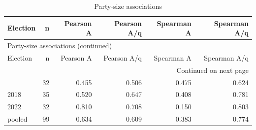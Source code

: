\begingroup
\scriptsize
\setlength{\tabcolsep}{3.2pt}
\begin{longtable}{lrrrrr}
\caption{Party-size associations}\label{tab:report-party-size-correlations} \\
\toprule
Election & n & Pearson A & Pearson A/q & Spearman A & Spearman A/q \\
\midrule
\endfirsthead
\multicolumn{6}{l}{\footnotesize Party-size associations (continued)} \\
\toprule
Election & n & Pearson A & Pearson A/q & Spearman A & Spearman A/q \\
\midrule
\endhead
\midrule
\multicolumn{6}{r}{\footnotesize Continued on next page} \\
\endfoot
\bottomrule
\endlastfoot
2014 & 32 & 0.455 & 0.506 & 0.475 & 0.624 \\
2018 & 35 & 0.520 & 0.647 & 0.408 & 0.781 \\
2022 & 32 & 0.810 & 0.708 & 0.150 & 0.803 \\
pooled & 99 & 0.634 & 0.609 & 0.383 & 0.774 \\
\end{longtable}
\endgroup

